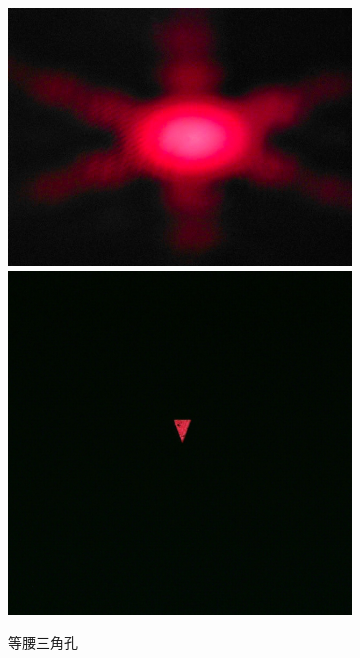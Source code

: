 \documentclass[a4paper]{article}
\begin{document}
\begin{figure}[htbp]
\begin{subfigure}[htbp]{0.3\textwidth}
        \includegraphics[width=\textwidth]{fre-done/2-3.JPG}
        \includegraphics[width=\textwidth]{img-done/2-3.JPG}
        \caption{等腰三角孔}
        \label{2-3}
    \end{subfigure}
    \begin{subfigure}[htbp]{0.3\textwidth}
        \centering

\end{subfigure}
\end{figure}
\end{document}
